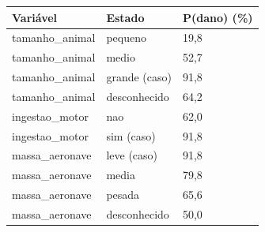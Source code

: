 \begin{tabular}{lll}
\toprule
Variável & Estado & P(dano) (\%) \\
\midrule
tamanho\_animal & pequeno & 19,8 \\
tamanho\_animal & medio & 52,7 \\
tamanho\_animal & grande (caso) & 91,8 \\
tamanho\_animal & desconhecido & 64,2 \\
ingestao\_motor & nao & 62,0 \\
ingestao\_motor & sim (caso) & 91,8 \\
massa\_aeronave & leve (caso) & 91,8 \\
massa\_aeronave & media & 79,8 \\
massa\_aeronave & pesada & 65,6 \\
massa\_aeronave & desconhecido & 50,0 \\
\bottomrule
\end{tabular}

